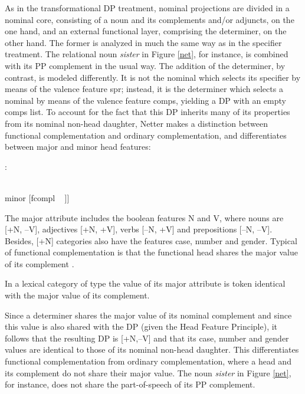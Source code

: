 \documentclass[output=paper]{langsci/langscibook}
\begin{document}
As in the transformational DP treatment, nominal projections are divided in a nominal core, 
consisting of a noun and its complements and/or adjuncts, on the one hand, and an external 
functional layer, comprising the determiner, on the other hand. The former is analyzed in much the 
same way as in the specifier treatment. The relational noun   
\emph{sister} in Figure \ref{net}, for instance, is combined with 
its PP complement in the usual way. The addition of the determiner, by contrast, is 
modeled differently. It is not the nominal which selects its specifier by means of the valence 
feature {\sc spr}; instead, it is the determiner which selects a nominal by means of 
the valence feature {\sc comps}, yielding a DP with an empty {\sc comps} list. 
To account for the fact that this DP inherits many of its properties from its nominal 
non-head daughter, Netter makes a distinction between functional 
complementation and ordinary complementation, and differentiates between major and minor 
{\sc head} features: 

\begin{exe} 
\ex {}:\\
 \begin{avm}
                              [major [n ~ \type{boolean} \\
                                      v ~ \type{boolean} ] \\
                               minor [fcompl ~ ]]
                              \end{avm} 
\end{exe} 

\noindent
The {\sc major} attribute includes the boolean features N and V, where 
nouns are [+N, --V], adjectives [+N, +V], verbs [--N, +V] and prepositions [--N, --V]. 
Besides, [+N] categories also have the features {\sc case}, {\sc number} and {\sc gender}. 
Typical of functional complementation is that the functional head shares the 
{\sc major} value of its complement \citep[311--312]{Netter94}. 

\begin{exe} 
\ex\label{maj} In a lexical category of type  the value of its {\sc major} 
      attribute is token identical with the {\sc major} value of its complement. 
\end{exe} 

\noindent
Since a determiner shares the {\sc major} value of its nominal complement and since this value is 
also shared with the DP (given the Head Feature Principle), it follows that the resulting 
DP is [+N,--V] and that its {\sc case}, {\sc number} and {\sc gender} values are 
identical to those of its nominal non-head daughter. 
This differentiates functional complementation from ordinary complementation, where 
a head and its complement do not share their {\sc major} value. The noun \emph{sister} 
in Figure \ref{net}, for instance, does not share the part-of-speech of its PP complement. 
\end{document}
